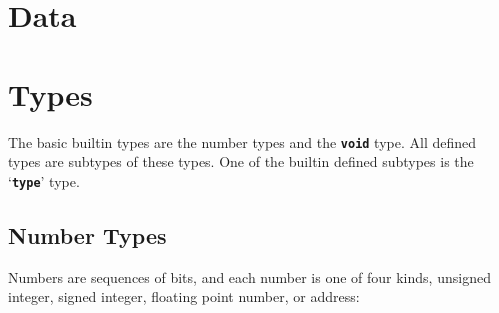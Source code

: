 \documentclass[12pt]{article}
\newcommand{\TT}[1]{{\tt \bfseries #1}}
\begin{document}
\section{Data}
\label{DATA}

\section{Types}
\label{TYPES}

The basic builtin types are the number types and the \TT{void} type.
All defined types are subtypes of these types.
One of the builtin defined subtypes is the `\TT{type}' type.

\subsection{Number Types}
\label{NUMBER-TYPES}

Numbers are sequences of bits, and each number is one of
four kinds, unsigned integer, signed integer, floating point number,
or address:
\end{document}
